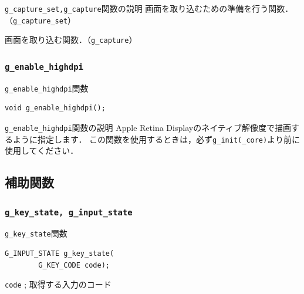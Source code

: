 \documentclass[platex,a4paper,12pt]{jsarticle}%
\begin{document}
\begin{itembox}[l]{\texttt{g\_capture\_set,g\_capture}関数の説明}
画面を取り込むための準備を行う関数．（\verb|g_capture_set|）

画面を取り込む関数．（\verb|g_capture|）
\end{itembox}

\subsubsection{\texttt{g\_enable\_highdpi}}

\begin{itembox}[l]{\texttt{g\_enable\_highdpi}関数}
\begin{verbatim}
void g_enable_highdpi();
\end{verbatim}
\end{itembox}

\begin{itembox}[l]{\texttt{g\_enable\_highdpi}関数の説明}
Apple Retina Displayのネイティブ解像度で描画するように指定します．
この関数を使用するときは，必ず\verb|g_init(_core)|より前に使用してください．
\end{itembox}

\clearpage
\subsection{補助関数}

\subsubsection{\texttt{g\_key\_state, g\_input\_state}}

\begin{itembox}[l]{\texttt{g\_key\_state}関数}
\begin{verbatim}
G_INPUT_STATE g_key_state(
        G_KEY_CODE code);
\end{verbatim}
\verb|code| ; 取得する入力のコード
\end{itembox}
\end{document}
